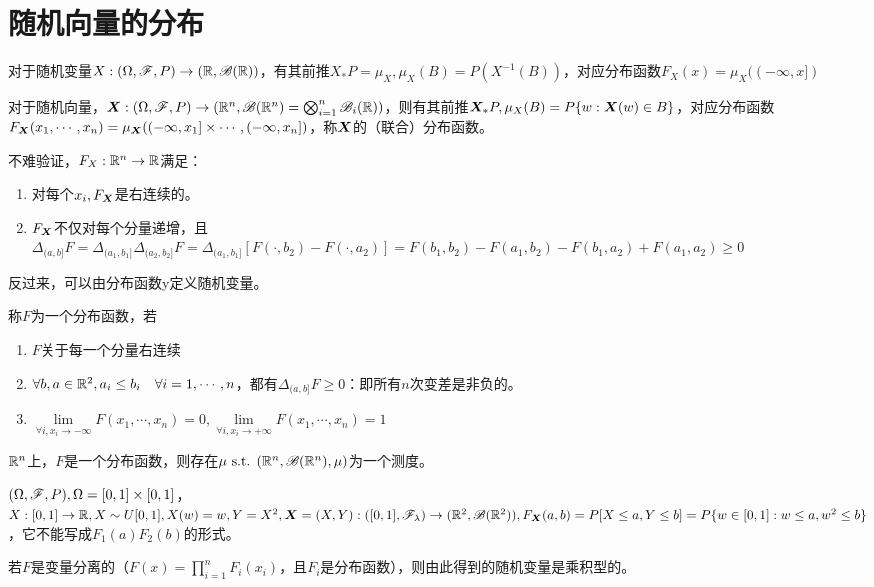 \documentclass{ctexart}
\begin{document}
\section{随机向量的分布}
对于随机变量$X:(\Omega,\mathscr{F},P)\to (\mathbb{R},\mathscr{B}(\mathbb{R}))$，有其前推$X_{*}P=\mu_{X}, \mu_{X}(B)=P(X^{-1}(B))$，对应分布函数$F_{X}(x)=\mu_{X}((-\infty,x])$

对于随机向量，$\bm{X}:(\Omega,\mathscr{F},P)\to (\mathbb{R}^{n},\mathscr{B}(\mathbb{R}^{n})=\bigotimes_{i=1}^{n} \mathscr{B}_{i}(\mathbb{R}))$，则有其前推$\bm{X}_{*}P,\mu_{X}(B)=P\{w:\bm{X}(w)\in B\}$，对应分布函数$F_{\bm{X}}(x_{1},\cdots, x_{n})=\mu_{\bm{X}}((-\infty,x_{1}]\times \cdots, (-\infty,x_{n}])$，称$\bm{X}$的（联合）分布函数。

不难验证，$F_{X}:\mathbb{R}^{n}\to\mathbb{R}$满足：
\begin{enumerate}
\item 对每个$x_{i}, F_{\bm{X}}$是右连续的。
\item $F_{\bm{X}}$不仅对每个分量递增，且$\Delta_{(a,b]}F=\Delta_{(a_{1},b_{1}]}\Delta_{(a_{2},b_{2}]}F=\Delta_{(a_{1},b_{1}]}[F(\cdot,b_{2})-F(\cdot,a_{2})]=F(b_{1},b_{2})-F(a_{1},b_{2})-F(b_{1},a_{2})+F(a_{1},a_{2})\geq 0$
\end{enumerate}

反过来，可以由分布函数y定义随机变量。

\begin{Def}
  称$F$为一个分布函数，若
  \begin{enumerate}
  \item $F$关于每一个分量右连续
  \item $\forall b,a\in\mathbb{R}^{2},a_{i}\leq b_{i}\quad\forall i=1,\cdots,n$，都有$\Delta_{(a,b]}F\geq 0$：即所有$n$次变差是非负的。
  \item $\lim\limits_{\forall i,x_{i}\to -\infty}F(x_{1},\cdots,x_{n})=0,\lim\limits_{\forall i,x_{i}\to +\infty}F(x_{1},\cdots,x_{n})=1$
  \end{enumerate}
\end{Def}

\begin{Eg}
  $\mathbb{R}^{n}$上，$F$是一个分布函数，则存在$\mu\text{ s.t. }(\mathbb{R}^{n},\mathscr{B}(\mathbb{R}^{n}),\mu)$为一个测度。
\end{Eg}
\begin{Eg}[$F$不总是乘积型的]
  $(\Omega,\mathscr{F},P),\Omega=[0,1]\times[0,1]$，$X:[0,1]\to\mathbb{R},X\sim U[0,1],X(w)=w, Y=X^{2},\bm{X}=(X,Y):([0,1],\mathscr{F}_{\lambda})\to(\mathbb{R}^{2},\mathscr{B}(\mathbb{R}^{2})), F_{\bm{X}}(a,b)=P[X\leq a, Y\leq b]=P\{w\in [0,1]:w\leq a,w^{2}\leq b\}$，它不能写成$F_{1}(a)F_{2}(b)$的形式。
\end{Eg}

\begin{Rmk}
  若$F$是变量分离的（$F(x)=\prod_{i=1}^{n}F_{i}(x_{i})$，且$F_{i}$是分布函数），则由此得到的随机变量是乘积型的。
\end{Rmk}
\end{document}
